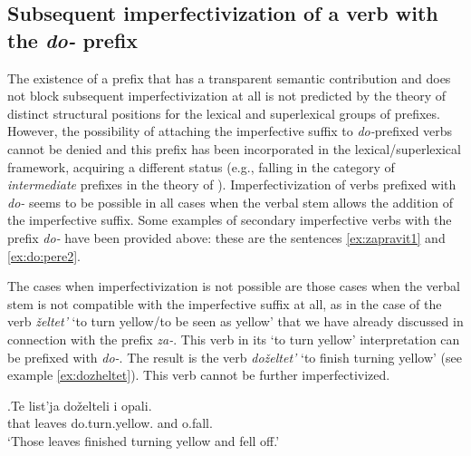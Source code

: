 \subsection{Subsequent imperfectivization of a verb with the \textit{do-} prefix}
The existence of a prefix that has a transparent semantic contribution and does not block subsequent imperfectivization at all is not predicted by the theory of distinct structural positions for the lexical and superlexical groups of prefixes. However, the possibility of attaching the imperfective suffix to \textit{do-}prefixed verbs cannot be denied and this prefix has been incorporated in the lexical/superlexical framework, acquiring a different status (e.g., falling in the category of \textit{intermediate} prefixes in the theory of \citealt{Tatevosov:07}). Imperfectivization of verbs prefixed with \textit{do-} seems to be possible in all cases when the verbal stem allows the addition of the imperfective suffix. Some examples of secondary imperfective verbs with the prefix \textit{do-} have been provided above: these are the sentences \ref{ex:zapravit1} and \ref{ex:do:pere2}.

The cases when imperfectivization is not possible are those cases when the verbal stem is not compatible with the imperfective suffix at all, as in the case of the verb \textit{\v{z}eltet'} `to turn yellow/to be seen as yellow' that we have already discussed in connection with the prefix \textit{za-}. This verb in its `to turn yellow' interpretation can be prefixed with \textit{do-}. The result is the verb \textit{do\v{z}eltet'} `to finish turning yellow' (see example \ref{ex:dozheltet}). This verb cannot be further imperfectivized. 

\exg.\label{ex:dozheltet}Te list'ja do\v{z}elteli i opali.\\
that leaves do.turn.yellow. and o.fall.\\
\trans `Those leaves finished turning yellow and fell off.'\\

